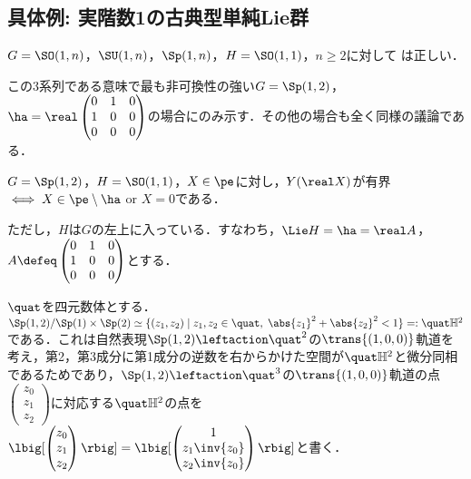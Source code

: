 \subsection{具体例: 実階数1の古典型単純Lie群}
\begin{prop}\label{prop:classical-rank-one}
  $G = \SO(1,n)$，$ \SU(1, n)$，$\Sp(1,n) $，$H = \SO(1,1) $，$n\geq 2$に対して は正しい．
\end{prop}

この3系列である意味で最も非可換性の強い$G = \Sp(1,2) $，$\ha = \real \begin{pmatrix}
    0 & 1 & 0 \\
    1 & 0 & 0\\
    0 & 0 & 0
  \end{pmatrix}$の場合にのみ示す．その他の場合も全く同様の議論である．
\begin{prop}\label{prop:1127-main}
  $G = \Sp(1,2) $，$H = \SO(1,1)$，$X\in \pe$に対し，$Y(\real X) $が有界$\iff X\in \pe\setminus \ha  $ or $X = 0$である．
\end{prop}

ただし，$H$は$G$の左上に入っている．すなわち，$\Lie H = \ha = \real A $，$A\defeq \begin{pmatrix}
  0 & 1 & 0 \\
  1 & 0 & 0\\
  0 & 0 & 0
\end{pmatrix}$とする．

\begin{nttdef}
  
  $\quat$を四元数体とする．$\Sp(1,2)/\Sp(1)\times \Sp(2) \simeq \{(z_1, z_2)\mid z_1,z_2\in \quat ,\; \abs{z_1}^2 + \abs{z_2}^2   < 1 \} =: \quat\mathbb{H}^2 $である．これは自然表現$\Sp(1,2)\leftaction \quat^2 $の$\trans{(1,0,0)} $軌道を考え，第2，第3成分に第1成分の逆数を右からかけた空間が$\quat\mathbb{H}^2$と微分同相であるためであり，$\Sp(1,2)\leftaction \quat^3 $の$\trans{(1,0,0)} $軌道の点$
  \begin{pmatrix}
    z_0 \\ z_1 \\ z_2 
  \end{pmatrix}
  $に対応する$\quat\mathbb{H}^2$の点を$
  \lbig[ \begin{pmatrix}
    z_0 \\ z_1 \\ z_2 
  \end{pmatrix}\rbig] = \lbig[ \begin{pmatrix}
    1 \\ z_1\inv{z_0} \\ z_2\inv{z_0} 
  \end{pmatrix}\rbig] 
  $と書く．
\end{nttdef}

